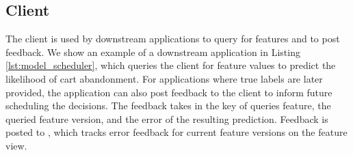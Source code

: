 %

%



\subsection{\system{} Client}
The \system{} client is used by downstream applications to query \system{} for features and to post feedback. We show an example of a downstream application in Listing \ref{lst:model_scheduler}, which queries the client for feature values to predict the likelihood of cart abandonment. For applications where true labels are later provided, the application can also post feedback to the client to inform future scheduling the decisions. The feedback takes in the key of queries feature, the queried feature version, and the error of the resulting prediction. Feedback is posted to \system{}, which tracks error feedback for current feature versions on the feature view.  


